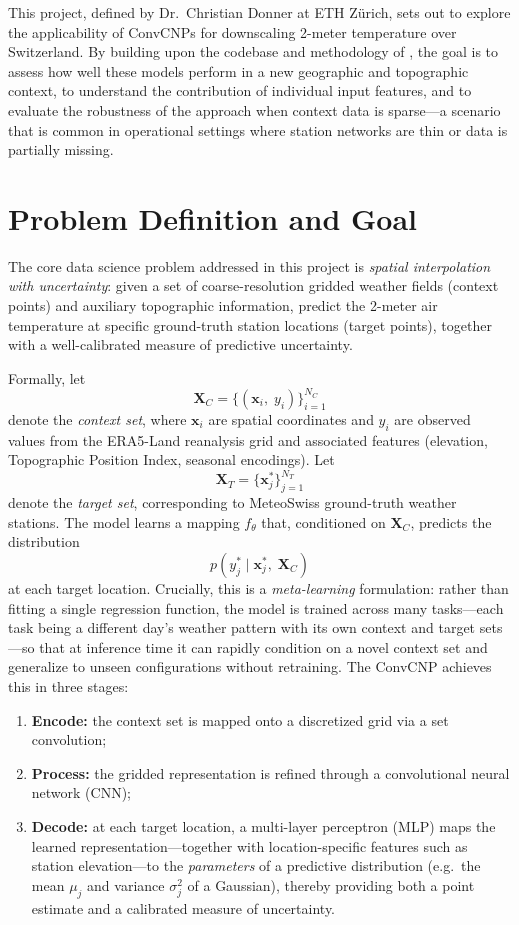 This project, defined by Dr.\ Christian Donner at ETH Z\"urich, sets out to explore the applicability of ConvCNPs for downscaling 2-meter temperature over Switzerland. By building upon the codebase and methodology of \citet{vaughan2022}, the goal is to assess how well these models perform in a new geographic and topographic context, to understand the contribution of individual input features, and to evaluate the robustness of the approach when context data is sparse---a scenario that is common in operational settings where station networks are thin or data is partially missing.

\section{Problem Definition and Goal}

The core data science problem addressed in this project is \textit{spatial interpolation with uncertainty}: given a set of coarse-resolution gridded weather fields (context points) and auxiliary topographic information, predict the 2-meter air temperature at specific ground-truth station locations (target points), together with a well-calibrated measure of predictive uncertainty.

Formally, let
%
\[
    \mathbf{X}_C = \{(\mathbf{x}_i,\; y_i)\}_{i=1}^{N_C}
\]
%
denote the \textit{context set}, where $\mathbf{x}_i$ are spatial coordinates and $y_i$ are observed values from the ERA5-Land reanalysis grid and associated features (elevation, Topographic Position Index, seasonal encodings). Let
%
\[
    \mathbf{X}_T = \{\mathbf{x}_j^*\}_{j=1}^{N_T}
\]
%
denote the \textit{target set}, corresponding to MeteoSwiss ground-truth weather stations. The model learns a mapping $f_\theta$ that, conditioned on $\mathbf{X}_C$, predicts the distribution
%
\[
    p(y_j^* \mid \mathbf{x}_j^*,\; \mathbf{X}_C)
\]
%
at each target location. Crucially, this is a \textit{meta-learning} formulation: rather than fitting a single regression function, the model is trained across many tasks---each task being a different day's weather pattern with its own context and target sets---so that at inference time it can rapidly condition on a novel context set and generalize to unseen configurations without retraining. The ConvCNP achieves this in three stages:
%
\begin{enumerate}
    \item \textbf{Encode:} the context set is mapped onto a discretized grid via a set convolution;
    \item \textbf{Process:} the gridded representation is refined through a convolutional neural network (CNN);
    \item \textbf{Decode:} at each target location, a multi-layer perceptron (MLP) maps the learned representation---together with location-specific features such as station elevation---to the \textit{parameters} of a predictive distribution (e.g.\ the mean $\mu_j$ and variance $\sigma_j^2$ of a Gaussian), thereby providing both a point estimate and a calibrated measure of uncertainty.
\end{enumerate}

